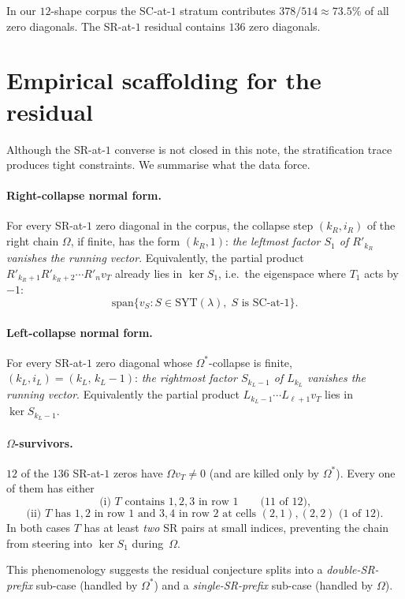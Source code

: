 \documentclass[11pt]{article}
\theoremstyle{definition}
\newcommand{\la}{\lambda}
\newcommand{\Om}{\Omega}
\newcommand{\Omstar}{\Omega^{*}}
\newcommand{\vT}{v_T}
\begin{document}
In our $12$-shape corpus the SC-at-$1$ stratum contributes
$378/514 \approx 73.5\%$ of all zero diagonals. The SR-at-$1$ residual
contains $136$ zero diagonals.

\section{Empirical scaffolding for the residual}

Although the SR-at-$1$ converse is not closed in this note, the
stratification trace produces tight constraints. We summarise what
the data force.

\paragraph{Right-collapse normal form.}
For every SR-at-$1$ zero diagonal in the corpus, the collapse step
$(k_R, i_R)$ of the right chain $\Om$, if finite, has the form
$(k_R, 1)$: \emph{the leftmost factor $S_1$ of $R'_{k_R}$ vanishes the
running vector}. Equivalently, the partial product
$R'_{k_R + 1} R'_{k_R + 2} \cdots R'_n \vT$ already lies in
$\ker S_1$, i.e.\ the eigenspace where $T_1$ acts by $-1$:
\[
\mathrm{span}\{v_S : S \in \mathrm{SYT}(\la),\; S \text{ is SC-at-}1\}.
\]

\paragraph{Left-collapse normal form.}
For every SR-at-$1$ zero diagonal whose $\Omstar$-collapse is finite,
$(k_L, i_L) = (k_L,\, k_L - 1)$: \emph{the rightmost factor
$S_{k_L - 1}$ of $L_{k_L}$ vanishes the running vector}. Equivalently
the partial product $L_{k_L - 1} \cdots L_{\ell + 1} \vT$ lies in
$\ker S_{k_L - 1}$.

\paragraph{$\Om$-survivors.}
$12$ of the $136$ SR-at-$1$ zeros have $\Om \vT \ne 0$ (and are killed
only by $\Omstar$). Every one of them has either
\[
\text{(i) } T \text{ contains } 1, 2, 3 \text{ in row } 1
\qquad\text{(11 of 12),}
\]
\[
\text{(ii) } T \text{ has } 1, 2 \text{ in row } 1 \text{ and } 3, 4
\text{ in row } 2 \text{ at cells }(2,1),(2,2) \text{ (1 of 12).}
\]
In both cases $T$ has at least \emph{two} SR pairs at small indices,
preventing the chain from steering into $\ker S_1$ during~$\Om$.

This phenomenology suggests the residual conjecture splits into a
\emph{double-SR-prefix} sub-case (handled by $\Omstar$) and a
\emph{single-SR-prefix} sub-case (handled by $\Om$).
\end{document}

